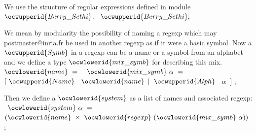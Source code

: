 \documentclass[12pt]{article}
\begin{document}
\ocwendcode{}\ocwindent{0.00em}
We use the structure of regular expressions defined in module \ocwbegindcode{}$\ocwupperid{Berry\_Sethi}$\ocwenddcode{}. 
\ocweol
\label{../ML/regular.ml:13078}%
\medskip
\ocwbegincode{}\ocwindent{0.00em}
~$\ocwupperid{Berry\_Sethi};$\medskip

\ocwendcode{}\ocwindent{0.00em}
We mean by modularity the possibility of naming a regexp which may
postmaster@inria.fr   be used in another regexp as if it were a basic symbol. 
   Now a \ocwbegindcode{}$\ocwupperid{Symb}$\ocwenddcode{} in a regexp can be a name or a symbol from an 
   alphabet and we define a type \ocwbegindcode{}$\ocwlowerid{mix\_symb}$\ocwenddcode{} for describing this mix. 
\ocweol
\label{../ML/regular.ml:13382}%
\medskip
\ocwbegincode{}\ocwindent{0.00em}
~$\ocwlowerid{name}~=~$\ocweol
\ocwindent{0.00em}
~$\ocwlowerid{mix\_symb}~\alpha{}~=~$\ocweol
\ocwindent{2.00em}
$[~\ocwupperid{Name}~$~$\ocwlowerid{name}$\ocweol
\ocwindent{2.00em}
$\mid{}~\ocwupperid{Alph}~$~$\alpha{}~$\ocweol
\ocwindent{2.00em}
$]$\ocweol
\ocwindent{0.00em}
;\medskip

\ocwendcode{}\ocwindent{0.00em}
Then we define a \ocwbegindcode{}$\ocwlowerid{system}$\ocwenddcode{} as a list of names and associated regexp: 
\ocweol
\label{../ML/regular.ml:13540}%
\medskip
\ocwbegincode{}\ocwindent{0.00em}
~$\ocwlowerid{system}~\alpha{}~=~$~$(\ocwlowerid{name}~\times{}~\ocwlowerid{regexp}~(\ocwlowerid{mix\_symb}~\alpha{}))$\ocweol
\ocwindent{0.00em}
;\medskip
\end{document}

